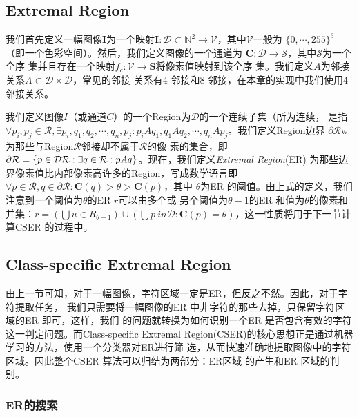 \subsection{Extremal Region}

我们首先定义一幅图像$\mathbf{I}$为一个映射$\mathbf{I} : \mathcal{D} \subset
\mathbb{N}^2 \rightarrow \mathcal{V}$，其中$\mathcal{V}$一般为
$\{0,\cdots,255\}^3$（即一个色彩空间）。然后，我们定义图像的一个通道为
$\mathbf{C} : \mathcal{D} \rightarrow \mathcal{S}$，其中$\mathcal{S}$为一个全序
集并且存在一个映射$f_c : \mathcal{V} \rightarrow \mathbf{S}$将像素值映射到该全序
集。我们定义$A$为邻接关系$A \subset \mathcal{D} \times \mathcal{D}$，常见的邻接
关系有4-邻接和8-邻接，在本章的实现中我们使用4-邻接关系。

我们定义图像$I$（或通道$C$）的一个Region为$\mathcal{D}$的一个连续子集（所为连续，
是指$\forall{p_i, p_j \in \mathcal{R}}, \exists{p_i, q_1, q_2, \cdots, q_n,
  p_j} : p_iAq_1, q_1Aq_2,\cdots,q_nAp_j$。我们定义Region边界
$\partial{\mathcal{R}}$w为那些与Region$\mathcal{R}$邻接却不属于$\mathcal{R}$的像
素的集合，即$\partial{\mathcal{R}} = \{p \in \mathcal{D} \\ \mathcal{R} :
\exists{q \in \mathcal{R}} : pAq \}$。现在，我们定义\textit{Extremal Region}(ER)
为那些边界像素值比内部像素高许多的Region，写成数学语言即$\forall{p \in
  \mathcal{R}}, q \in \partial{\mathcal{R}} : \mathbf{C}(q) > \theta > \mathbf{C}(p)$，其中
$\theta$为ER 的阈值。由上式的定义，我们注意到一个阈值为$\theta$的ER $r$可以由多个或
另个阈值为$\theta - 1$的ER 和值为$\theta$的像素和并集：$r = \left( \bigcup{u \in
    R_{\theta-1}} \right) \cup \left( \bigcup{p \ in \mathcal{D} : \mathbf{C}(p)
  = \theta} \right)$，这一性质将用于下一节计算CSER 的过程中。

\subsection{Class-specific Extremal Region}

由上一节可知，对于一幅图像，字符区域一定是ER，但反之不然。因此，对于字符提取任务，
我们只需要将一幅图像的ER 中非字符的那些去掉，只保留字符区域的ER 即可，这样，我们
的问题就转换为如何识别一个ER 是否包含有效的字符这一判定问题。而Class-specific
Extremal Region(CSER)\cite{Neumann:2012ik}的核心思想正是通过机器学习的方法，使用一个分类器对ER进行筛
选，从而快速准确地提取图像中的字符区域。因此整个CSER 算法可以归结为两部分：ER区域
的产生和ER 区域的判别。

\subsubsection{ER的搜索}

